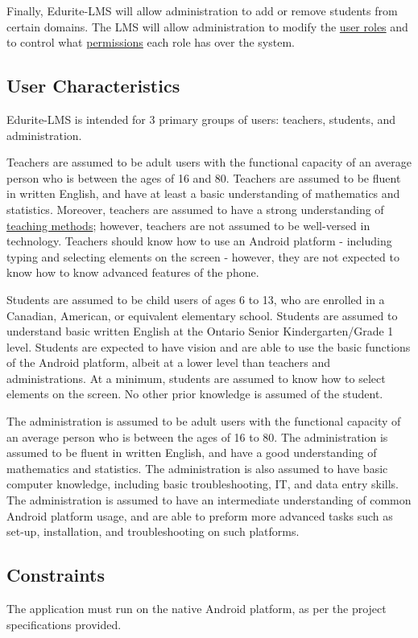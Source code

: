 \documentclass[]{article}
\begin{document}
Finally, Edurite-LMS will allow administration to add or remove students from
certain domains. The LMS will allow administration to modify the
\underline{user roles} and to control what \underline{permissions} each role has
over the system.

\subsection{User Characteristics}
\label{sub:user_characteristics}
Edurite-LMS is intended for 3 primary groups of users: teachers, students, and
administration.

Teachers are assumed to be adult users with the functional capacity of an
average person who is between the ages of 16 and 80. Teachers are assumed to be
fluent in written English, and have at least a basic understanding of
mathematics and statistics. Moreover, teachers are assumed to have a strong
understanding of \underline{teaching methods}; however, teachers are not assumed to be
well-versed in technology. Teachers should know how to use an Android platform
- including typing and selecting elements on the screen - however, they are not
expected to know how to know advanced features of the phone.

Students are assumed to be child users of ages 6 to 13, who are enrolled in a
Canadian, American, or equivalent elementary school. Students are assumed to
understand basic written English at the Ontario Senior Kindergarten/Grade 1
level. Students are expected to have vision and are able to use the basic
functions of the Android platform, albeit at a lower level than teachers and
administrations. At a minimum, students are assumed to know how to select
elements on the screen. No other prior knowledge is assumed of the student.

The administration is assumed to be adult users with the functional capacity of
an average person who is between the ages of 16 to 80. The administration is
assumed to be fluent in written English, and have a good understanding of
mathematics and statistics. The administration is also assumed to have basic
computer knowledge, including basic troubleshooting, IT, and data entry skills.
The administration is assumed to have an intermediate understanding of common
Android platform usage, and are able to preform more advanced tasks such as
set-up, installation, and troubleshooting on such platforms.

\subsection{Constraints}
\label{sub:constraints}
The application must run on the native Android platform, as per the project
specifications provided.
\end{document}
